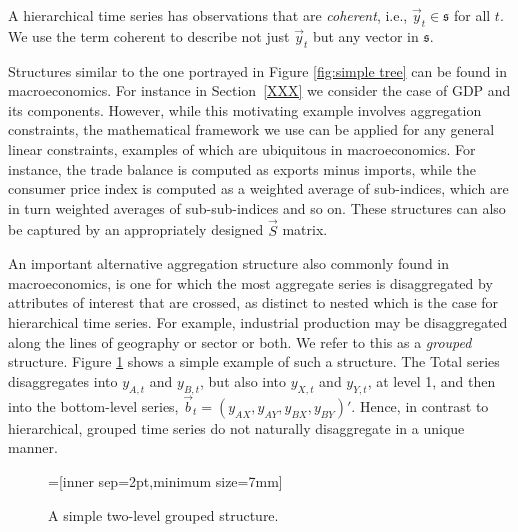 \documentclass[graybox]{svmult}
\begin{document}
\begin{property}
A hierarchical time series has observations that are \textit{coherent}, i.e., $\vec{y}_{t} \in \mathfrak{s}$ for all $t$. We use the term coherent to describe not just $\vec{y}_t$ but any vector in $\mathfrak{s}$.
  \label{def:coherence}
\end{property}


Structures similar to the one portrayed in Figure \ref{fig:simple tree} can be found in macroeconomics. For instance in Section~\ref{XXX} we consider the case of GDP and its components.  However, while this motivating example involves aggregation constraints, the mathematical framework we use can be applied for any general linear constraints, examples of which are ubiquitous in macroeconomics. For instance, the trade balance is computed as exports minus imports, while the consumer price index is computed as a weighted average of sub-indices, which are in turn weighted averages of sub-sub-indices and so on.  These structures can also be captured by an appropriately designed $\vec{S}$ matrix.

An important alternative aggregation structure also commonly found in macroeconomics, is one for which the most aggregate series is disaggregated by attributes of interest that are crossed, as distinct to nested which is the case for hierarchical time series. For example, industrial production may be disaggregated along the lines of geography or sector or both. We refer to this as a \textit{grouped} structure. Figure \ref{fig:simple grouped tree} shows a simple example of such a structure. The Total series disaggregates into $y_{A,t}$ and $y_{B,t}$, but also into $y_{X,t}$ and $y_{Y,t}$, at level 1, and then into the bottom-level series, $\vec{b}_t=(y_{AX}, y_{AY}, y_{BX}, y_{BY})'$. Hence, in contrast to hierarchical, grouped time series do not naturally disaggregate in a unique manner.
\begin{figure}[!hbt]
\center
{}=[inner sep=2pt,minimum size=7mm]
  \caption{A simple two-level grouped structure.}
  \label{fig:simple grouped tree}
\end{figure}
\end{document}
